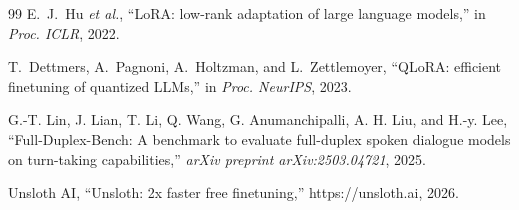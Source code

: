 \documentclass[conference]{IEEEtran}
\begin{document}
\begin{thebibliography}{99}
E.~J.~Hu \emph{et al.},
``LoRA: low-rank adaptation of large language models,'' in \emph{Proc. ICLR}, 2022.

T.~Dettmers, A.~Pagnoni, A.~Holtzman, and L.~Zettlemoyer,
``QLoRA: efficient finetuning of quantized LLMs,'' in \emph{Proc. NeurIPS}, 2023.

G.-T. Lin, J. Lian, T. Li, Q. Wang, G. Anumanchipalli, A. H. Liu, and H.-y. Lee,
``Full-Duplex-Bench: A benchmark to evaluate full-duplex spoken dialogue models on
turn-taking capabilities,'' \emph{arXiv preprint arXiv:2503.04721}, 2025.

Unsloth AI, ``Unsloth: 2x faster free finetuning,'' https://unsloth.ai, 2026.

\end{thebibliography}
\end{document}

